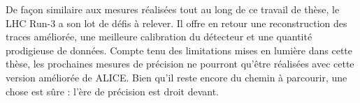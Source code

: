%

De façon similaire aux mesures réalisées tout au long de ce travail de thèse, le LHC Run-3 a son lot de défis à relever. Il offre en retour une reconstruction des traces améliorée, une meilleure calibration du détecteur et une quantité prodigieuse de données. Compte tenu des limitations mises en lumière dans cette thèse, les prochaines mesures de précision ne pourront qu'être réalisées avec cette version améliorée de ALICE. Bien qu'il reste encore du chemin à parcourir, une chose est sûre : l'ère de précision est droit devant. 